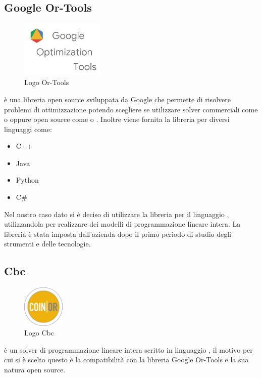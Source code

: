 \subsection{Google Or-Tools}
\begin{figure}[H]
	\begin{center} \includegraphics[width=4cm]{figures/google_or_tools}
		\caption[Logo Or-Tools]{Logo Or-Tools}  
	\end{center}
\end{figure}
 è una libreria open source sviluppata da Google che permette di risolvere problemi di ottimizzazione potendo scegliere se utilizzare solver commerciali come  o  oppure open source come  o . Inoltre viene fornita la libreria per diversi linguaggi come:
\begin{itemize}
	\item C++
	\item Java
	\item Python
	\item C\#
\end{itemize}
Nel nostro caso dato si è deciso di utilizzare la libreria per il linguaggio , utilizzandola per realizzare dei modelli di programmazione lineare intera. La libreria è stata imposta dall'azienda dopo il primo periodo di studio degli strumenti e delle tecnologie.

\subsection{Cbc}

\begin{figure}[H]
	\begin{center} \includegraphics[width=2cm]{figures/coin_banner}
		\caption[Logo Cbc]{Logo Cbc}  
	\end{center}
\end{figure}
 è un solver di programmazione lineare intera scritto in linguaggio , il motivo per cui si è scelto questo è la compatibilità con la libreria Google Or-Tools e la sua natura open source.


